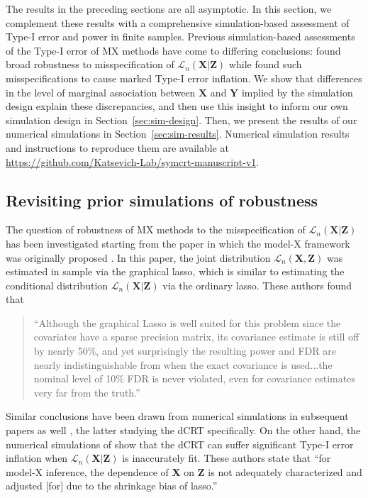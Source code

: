 \documentclass[12pt]{article}
\theoremstyle{definition}
\theoremstyle{remark}
\newcommand{\prx}{\bm X}								%
\newcommand{\prz}{\bm Z}								%
\newcommand{\pry}{{\bm Y}}								%
\newcommand{\law}{\mathcal L}							%
\begin{document}
	The results in the preceding sections are all asymptotic. In this section, we complement these results with a comprehensive simulation-based assessment of Type-I error and power in finite samples. Previous simulation-based assessments of the Type-I error of MX methods have come to differing conclusions: \citet{SetC17, Romano2019a, SetS19, Liu2022a} found broad robustness to misspecification of $\law_n(\prx|\prz)$ while \citet{Li2022} found such misspecifications to cause marked Type-I error inflation. We show that differences in the level of marginal association between $\prx$ and $\pry$ implied by the simulation design explain these discrepancies, and then use this insight to inform our own simulation design in Section~\ref{sec:sim-design}. Then, we present the results of our numerical simulations in Section~\ref{sec:sim-results}. Numerical simulation results and instructions to reproduce them are available at \url{https://github.com/Katsevich-Lab/symcrt-manuscript-v1}.	

	\subsection{Revisiting prior simulations of robustness}  \label{sec:sim-revisiting}
	
	The question of robustness of MX methods to the misspecification of $\law_n(\prx|\prz)$ has been investigated starting from the paper in which the model-X framework was originally proposed \citep{CetL16}. In this paper, the joint distribution $\law_n(\prx,\prz)$ was estimated in sample via the graphical lasso, which is similar to estimating the conditional distribution $\law_n(\prx|\prz)$ via the ordinary lasso. These authors found that
	\begin{quote}
		``Although the graphical Lasso is well suited for this problem since the covariates have a sparse precision matrix, its covariance estimate is still off by nearly 50\%, and yet surprisingly the resulting power and FDR are nearly indistinguishable from when the exact covariance is used...the nominal level of 10\% FDR is never violated, even for covariance estimates very far from the truth.''
	\end{quote}
	Similar conclusions have been drawn from numerical simulations in subsequent papers as well \citep{SetC17, Romano2019a, SetS19, Liu2022a}, the latter studying the dCRT specifically. On the other hand, the numerical simulations of \citet{Li2022} show that the dCRT can suffer significant Type-I error inflation when $\law_n(\prx|\prz)$ is inaccurately fit. These authors state that ``for model-X inference, the dependence of $\prx$ on $\prz$ is not adequately characterized and adjusted [for] due to the shrinkage bias of lasso.''
	
\end{document}
